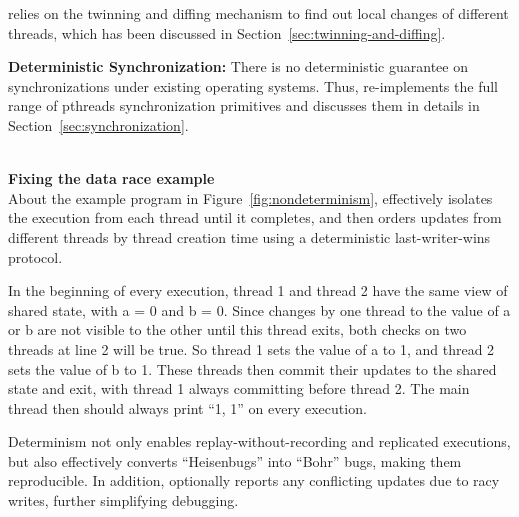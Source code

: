 \dthreads{} relies on the twinning and diffing mechanism to find out local changes of different threads, which has been discussed in Section~\ref{sec:twinning-and-diffing}. 

\textbf{Deterministic Synchronization:}
There is no deterministic guarantee on synchronizations under existing operating systems. Thus, \dthreads{} re-implements the full range of pthreads synchronization primitives and discusses  them in details in Section~\ref{sec:synchronization}. 

\hspace{1em} \\
\noindent
\textbf{Fixing the data race example} \\
About the example program in Figure~\ref{fig:nondeterminism},  \dthreads{} effectively isolates the execution from each thread until it completes, and then orders updates from different threads by thread creation time using a deterministic last-writer-wins protocol.

In the beginning of every execution, thread 1 and thread 2 have the same view of shared state, with a = 0 and b = 0. Since changes by one thread to the value of a or b are not visible to the other until this thread exits, both checks on two threads at line 2 will be true. So thread 1 sets the value of a to 1, and thread 2 sets the value of b to 1. These threads then commit their updates to the shared state and exit, with thread 1 always committing before thread 2. The main thread then should always print ``1, 1'' on every execution.

Determinism not only enables replay-without-recording and replicated executions, but also effectively converts ``Heisenbugs'' into ``Bohr'' bugs, making them reproducible. In addition, \dthreads{} optionally reports any conflicting updates due to racy writes, further simplifying debugging.
